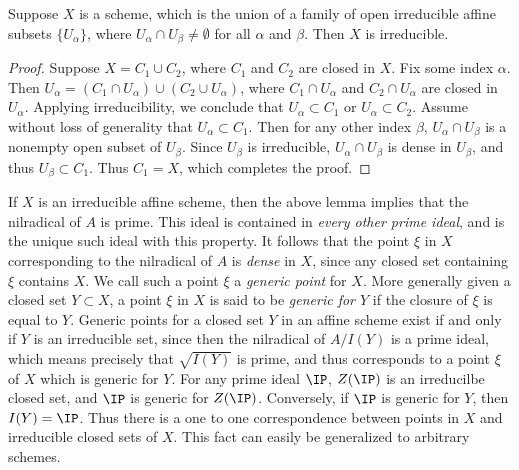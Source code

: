 \begin{lemma}
    Suppose $X$ is a scheme, which is the union of a family of open irreducible affine subsets $\{ U_\alpha \}$, where $U_\alpha \cap U_\beta \neq \emptyset$ for all $\alpha$ and $\beta$. Then $X$ is irreducible.
\end{lemma}
\begin{proof}
    Suppose $X = C_1 \cup C_2$, where $C_1$ and $C_2$ are closed in $X$. Fix some index $\alpha$. Then $U_{\alpha} = (C_1 \cap U_{\alpha}) \cup (C_2 \cup U_{\alpha})$, where $C_1 \cap U_{\alpha}$ and $C_2 \cap U_{\alpha}$ are closed in $U_{\alpha}$. Applying irreducibility, we conclude that $U_{\alpha} \subset C_1$ or $U_{\alpha} \subset C_2$. Assume without loss of generality that $U_\alpha \subset C_1$. Then for any other index $\beta$, $U_\alpha \cap U_\beta$ is a nonempty open subset of $U_\beta$. Since $U_\beta$ is irreducible, $U_\alpha \cap U_\beta$ is dense in $U_\beta$, and thus $U_\beta \subset C_1$. Thus $C_1 = X$, which completes the proof.
\end{proof}

If $X$ is an irreducible affine scheme, then the above lemma implies that the nilradical of $A$ is prime. This ideal is contained in \emph{every other prime ideal}, and is the unique such ideal with this property. It follows that the point $\xi$ in $X$ corresponding to the nilradical of $A$ is \emph{dense} in $X$, since any closed set containing $\xi$ contains $X$. We call such a point $\xi$ a \emph{generic point} for $X$. More generally given a closed set $Y \subset X$, a point $\xi$ in $X$ is said to be \emph{generic for $Y$} if the closure of $\xi$ is equal to $Y$. Generic points for a closed set $Y$ in an affine scheme exist if and only if $Y$ is an irreducible set, since then the nilradical of $A/I(Y)$ is a prime ideal, which means precisely that $\sqrt{I(Y)}$ is prime, and thus corresponds to a point $\xi$ of $X$ which is generic for $Y$. For any prime ideal $\IP$, $Z(\IP)$ is an irreducilbe closed set, and $\IP$ is generic for $Z(\IP)$. Conversely, if $\IP$ is generic for $Y$, then $I(Y) = \IP$. Thus there is a one to one correspondence between points in $X$ and irreducible closed sets of $X$. This fact can easily be generalized to arbitrary schemes.

